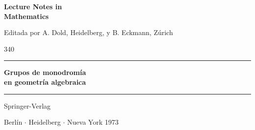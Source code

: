 
\begin{titlepage}
\thispagestyle{empty}
\begin{flushleft}
{\Huge\bfseries Lecture Notes in\\Mathematics\par}
\vspace{1.5em}
{\large Editada por A. Dold, Heidelberg, y B. Eckmann, Zúrich\par}
\vfill
{\Huge 340\par}
\vspace{1em}\hrule\vspace{1.5em}
{\Huge\bfseries Grupos de monodromía\\en geometría algebraica\par}
\vfill
\hrule\vspace{1.5em}
{\Large Springer-Verlag\par}
{\Large Berlín $\cdot$ Heidelberg $\cdot$ Nueva York 1973\par}
\end{flushleft}
\end{titlepage}

